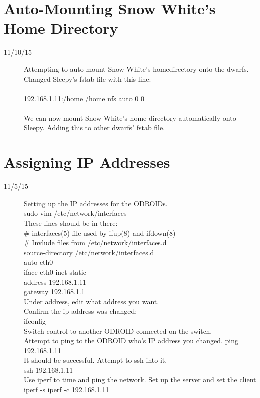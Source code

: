 \section{Auto-Mounting Snow White's Home Directory}
\begin{description}
\item [11/10/15] Attempting to auto-mount Snow White's homedirectory onto the dwarfs. Changed Sleepy's fstab file with this line: \\ \\
192.168.1.11:/home /home nfs auto 0 0 \\ \\
We can now mount Snow White's home directory automatically onto Sleepy. Adding this to other dwarfs' fstab file.
\end{description}

\section{Assigning IP Addresses}
\begin{description}
\item [11/5/15] Setting up the IP addresses for the ODROIDs. \\
sudo vim /etc/network/interfaces \\
These lines should be in there: \\
\# interfaces(5) file used by ifup(8) and ifdown(8) \\
\# Invlude files from /etc/network/interfaces.d \\
source-directory /etc/network/interfaces.d \\
auto eth0 \\
iface eth0 inet static \\
address 192.168.1.11 \\
gateway 192.168.1.1 \\
Under address, edit what address you want.\\
Confirm the ip address was changed: \\
ifconfig \\
Switch control to another ODROID connected on the switch. \\
Attempt to ping to the ODROID who's IP address you changed.
ping 192.168.1.11 \\
It should be successful. Attempt to ssh into it. \\
ssh 192.168.1.11 \\
Use iperf to time and ping the network. Set up the server and set the client \\
iperf -s
iperf -c 192.168.1.11
\end{description}

